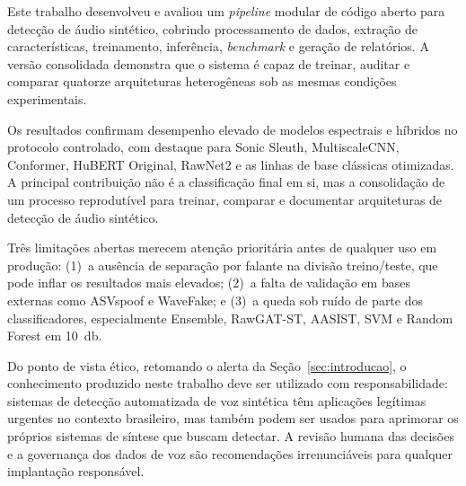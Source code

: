 \documentclass[12pt,a4paper]{article}
\begin{document}
Este trabalho desenvolveu e avaliou um \textit{pipeline} modular de código
aberto para detecção de áudio sintético, cobrindo processamento de dados,
extração de características, treinamento, inferência, \textit{benchmark} e
geração de relatórios. A versão consolidada demonstra que o sistema é capaz de
treinar, auditar e comparar quatorze arquiteturas heterogêneas sob as mesmas
condições experimentais.

Os resultados confirmam desempenho elevado de modelos espectrais e híbridos no
protocolo controlado, com destaque para Sonic Sleuth, MultiscaleCNN,
Conformer, HuBERT Original, RawNet2 e as linhas de base clássicas otimizadas. A
principal contribuição não é a classificação final em si, mas a consolidação de um
processo reprodutível para treinar, comparar e documentar arquiteturas de
detecção de áudio sintético.

Três limitações abertas merecem atenção prioritária antes de qualquer uso em
produção: (1)~a ausência de separação por falante na divisão treino/teste, que
pode inflar os resultados mais elevados; (2)~a falta de validação em bases
externas como ASVspoof e WaveFake; e (3)~a queda sob ruído de parte dos
classificadores, especialmente Ensemble, RawGAT-ST, AASIST, SVM e Random
Forest em \SI{10}{\decibel}.

Do ponto de vista ético, retomando o alerta da Seção~\ref{sec:introducao}, o
conhecimento produzido neste trabalho deve ser utilizado com responsabilidade:
sistemas de detecção automatizada de voz sintética têm aplicações legítimas
urgentes no contexto brasileiro, mas também podem ser usados para aprimorar
os próprios sistemas de síntese que buscam detectar. A revisão humana das
decisões e a governança dos dados de voz são recomendações irrenunciáveis para
qualquer implantação responsável.
\end{document}
